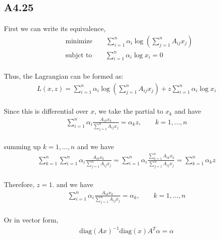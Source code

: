 \subsection*{A4.25}
\paragraph{}
First we can write its equivalence,
\begin{align*}
&\text{minimize}\qquad \sum_{i=1}^{n}\alpha_i \log(\sum_{j=1}^{n}A_{ij}x_j)\\
&\text{subjct to}\qquad \sum_{i=1}^{n} \alpha_i \log x_i =0
\end{align*}
\paragraph{}
Thus, the Lagrangian can be formed as:
\begin{align*}
L(x, z) = \sum_{i=1}^{n}\alpha_i \log(\sum_{j=1}^{n}A_{ij}x_j) + z\sum_{i=1}^{n} \alpha_i \log x_i
\end{align*}
\paragraph{}
Since this is differential over $x$, we take the partial to $x_k$ and have
\begin{align*}
\sum_{i=1}^{n} \alpha_i\frac{A_{ik}x_k}{\sum_{j=1}^{n}A_{ij}x_j} = \alpha_k z, \qquad k=1,...,n
\end{align*}
\paragraph{}
summing up $k =1,...,n$ and we have
\begin{align*}
\sum_{k=1}^{n}\sum_{i=1}^{n} \alpha_i\frac{A_{ik}x_k}{\sum_{j=1}^{n}A_{ij}x_j} =\sum_{i=1}^{n} \alpha_i\frac{\sum_{k=1}^{n}A_{ik}x_k}{\sum_{j=1}^{n}A_{ij}x_j}  =\sum_{k=1}^{n}\alpha_k z
\end{align*}
\paragraph{}
Therefore, $z =1$. and we have
\begin{align*}
\sum_{i=1}^{n} \alpha_i\frac{A_{ik}x_k}{\sum_{j=1}^{n}A_{ij}x_j} = \alpha_k, \qquad k =1,...,n
\end{align*}
\paragraph{}
Or in vector form,
\begin{align*}
\text{diag}(Ax)^{-1}\text{diag}(x)A^T \alpha = \alpha
\end{align*}

